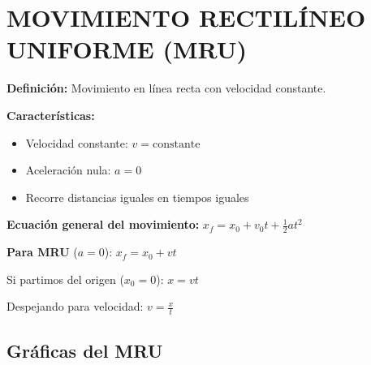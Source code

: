 \newpage

\section{MOVIMIENTO RECTILÍNEO UNIFORME (MRU)}

\begin{seccion}
\begin{definicion}
    \textbf{Definición:} Movimiento en línea recta con velocidad constante.
\end{definicion}
\vspace{0.3cm}

\textbf{Características:}
\begin{itemize}
    \item Velocidad constante: $v = \text{constante}$
    \item Aceleración nula: $a = 0$
    \item Recorre distancias iguales en tiempos iguales
\end{itemize}

\begin{ecuacion}
\textbf{Ecuación general del movimiento:}
$x_f = x_0 + v_0 t + \frac{1}{2}at^2$

\textbf{Para MRU} ($a = 0$):
$x_f = x_0 + vt$

Si partimos del origen ($x_0 = 0$):
$x = vt$

Despejando para velocidad:
$v = \frac{x}{t}$
\end{ecuacion}
\end{seccion}


\subsection{Gráficas del MRU}

